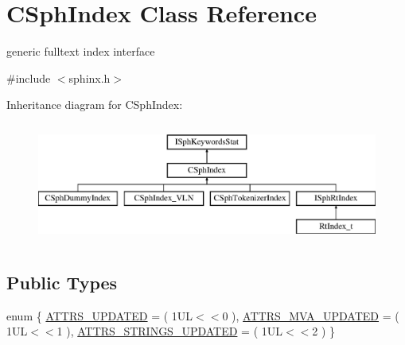 \hypertarget{classCSphIndex}{\section{C\-Sph\-Index Class Reference}
\label{classCSphIndex}
}


generic fulltext index interface  




{\ttfamily \#include $<$sphinx.\-h$>$}

Inheritance diagram for C\-Sph\-Index\-:\begin{figure}[H]
\begin{center}
\leavevmode
\includegraphics[height=4.000000cm]{classCSphIndex}
\end{center}
\end{figure}
\subsection*{Public Types}
\begin{DoxyCompactItemize}
\item 
enum \{ \hyperlink{classCSphIndex_a8a376baae2fc98ea547f168d91f33a80af1ef6a732e57d3cf3a305586a252b171}{A\-T\-T\-R\-S\-\_\-\-U\-P\-D\-A\-T\-E\-D} = ( 1\-U\-L$<$$<$0 ), 
\hyperlink{classCSphIndex_a8a376baae2fc98ea547f168d91f33a80a26248beafc570c5da7a55fb975a2a056}{A\-T\-T\-R\-S\-\_\-\-M\-V\-A\-\_\-\-U\-P\-D\-A\-T\-E\-D} = ( 1\-U\-L$<$$<$1 ), 
\hyperlink{classCSphIndex_a8a376baae2fc98ea547f168d91f33a80a04ed87ed8dc253abe2064e394d8c76ef}{A\-T\-T\-R\-S\-\_\-\-S\-T\-R\-I\-N\-G\-S\-\_\-\-U\-P\-D\-A\-T\-E\-D} = ( 1\-U\-L$<$$<$2 )
 \}
\end{DoxyCompactItemize}
